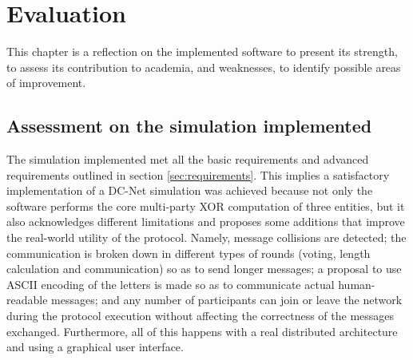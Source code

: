 \chapter{Evaluation}
This chapter is a reflection on the implemented software to present its strength, to assess its contribution to academia,  and weaknesses, to identify possible areas of improvement. 

\section{Assessment on the simulation implemented}
The simulation implemented met all the basic requirements and advanced requirements outlined in section \ref{sec:requirements}. This implies a satisfactory implementation of a DC-Net simulation was achieved because not only the software performs the core multi-party XOR computation of three entities, but it also acknowledges different limitations and proposes some additions that improve the real-world utility of the protocol. Namely, message collisions are detected; the communication is broken down in different types of rounds (voting, length calculation and communication) so as to send longer messages; a proposal to use ASCII encoding of the letters is made so as to communicate actual human-readable messages; and any number of participants can join or leave the network during the protocol execution without affecting the correctness of the messages exchanged. Furthermore, all of this happens with a real distributed architecture and using a graphical user interface.


